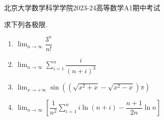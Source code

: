 \documentclass{ctexart}
\begin{document}
\pagestyle{empty}
\begin{center}\Large
    北京大学数学科学学院2023-24高等数学A1期中考试
\end{center}
\begin{problem}[1.(20\songti{分})]
    求下列各极限.
    \begin{enumerate}[label=\textbf{(\arabic*)}]
        \item $\displaystyle\lim_{n\to\infty}{\dfrac{3^n}{n!}}$
        \item $\displaystyle\lim_{n\to\infty}{\sum_{i=1}^{n}{\dfrac{i}{(n+i)^3}}}$
        \item $\displaystyle\lim_{x\to+\infty}{\sin\left(\left(\sqrt{x^2+x}-\sqrt{x^2-x}\right)\pi\right)}$
        \item $\displaystyle\lim_{n\to\infty}\left[\dfrac{1}{n^2}\sum_{i=1}^{n}i\ln(n+i)-\dfrac{n+1}{2n}\ln{n}\right]$
    \end{enumerate}
\end{problem}
\end{document}
